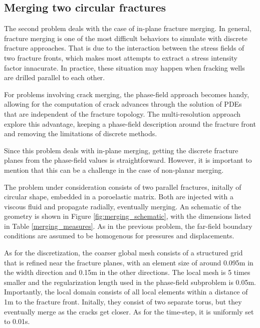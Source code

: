 \FloatBarrier

\subsection{Merging two circular fractures}

The second problem deals with the case of in-plane fracture merging. In general, fracture merging is one of the most difficult behaviors to simulate with discrete fracture approaches. That is due to the interaction between the stress fields of two fracture fronts, which makes most attempts to extract a stress intensity factor innacurate. In practice, these situation may happen when fracking wells are drilled parallel to each other. 

For problems involving crack merging, the phase-field approach becomes handy, allowing for the computation of crack advances through the solution of PDEs that are independent of the fracture topology.
The multi-resolution approach explore this advantage, keeping a phase-field description around the fracture front and removing the limitations of discrete methods.

Since this problem deals with in-plane merging, getting the discrete fracture planes from the phase-field values is straightforward. However, it is important to mention that this can be a challenge in the case of non-planar merging.

The problem under consideration consists of two parallel fractures, initally of circular shape, embedded in a poroelastic matrix. Both are injected with a viscous fluid and propagate radially, eventually merging. An schematic of the geometry is shown in Figure \ref{fig:merging_schematic}, with the dimensions listed in Table \ref{merging_measures}. As in the previous problem, the far-field boundary conditions are assumed to be homogenous for pressures and displacements. 

As for the discretization, the coarser global mesh consists of a structured grid that is refined near the fracture planes, with an element size of around 0.095m in the width direction and 0.15m in the other directions. The local mesh is 5 times smaller and the regularization length used in the phase-field subproblem is 0.05m. Importantly, the local domain consists of all local elements within a distance of 1m to the fracture front. Initally, they consist of two separate torus, but they eventually merge as the cracks get closer. As for the time-step, it is uniformly set to 0.01s.

